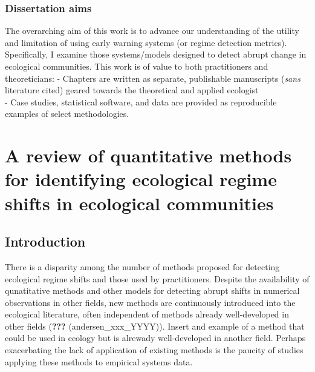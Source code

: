 \documentclass[12pt,twoside]{reedthesis}
\begin{document}
\hypertarget{dissertation-aims}{%
\subsection{Dissertation aims}\label{dissertation-aims}}

The overarching aim of this work is to advance our understanding of the utility and limitation of using early warning systems (or regime detection metrics). Specifically, I examine those systems/models designed to detect abrupt change in ecological communities. This work is of value to both practitioners and theoreticians:
- Chapters are written as separate, publishable manuscripts (\emph{sans} literature cited) geared towards the theoretical and applied ecologist\\
- Case studies, statistical software, and data are provided as reproducible examples of select methodologies.

\hypertarget{chapter-rdmMethodsReview}{%
\chapter{A review of quantitative methods for identifying ecological regime shifts in ecological communities}\label{chapter-rdmMethodsReview}}

\hypertarget{introduction}{%
\section{Introduction}\label{introduction}}

There is a disparity among the number of methods proposed for detecting ecological regime shifts and those used by practitioners. Despite the availability of qunatitative methods and other models for detecting abrupt shifts in numerical observations in other fields, new methods are continuously introduced into the ecological literature, often independent of methods already well-developed in other fields ({\textbf{???}} (andersen\_xxx\_YYYY)). Insert and example of a method that could be used in ecology but is alrewady well-developed in another field. Perhaps exacerbating the lack of application of existing methods is the paucity of studies applying these methods to empirical systems data.
\end{document}
